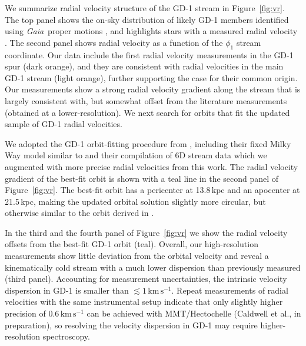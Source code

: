 \documentclass[twocolumn]{aastex63}
\newcommand{\gaia}{\textsl{Gaia}}
\newcommand{\kms}{\ensuremath{\textrm{km}\,\textrm{s}^{-1}}}
\begin{document}
We summarize radial velocity structure of the GD-1 stream in Figure~\ref{fig:vr}.
The top panel shows the on-sky distribution of likely GD-1 members identified using \gaia\ proper motions \citep[small points,][]{pwb}, and highlights stars with a measured radial velocity \citep[orange for this work, gray for literature data from][]{koposov2010}.
The second panel shows radial velocity as a function of the $\phi_1$ stream coordinate.
Our data include the first radial velocity measurements in the GD-1 spur (dark orange), and they are consistent with radial velocities in the main GD-1 stream (light orange), further supporting the case for their common origin.
Our measurements show a strong radial velocity gradient along the stream that is largely consistent with, but somewhat offset from the literature measurements (obtained at a lower-resolution).
We next search for orbits that fit the updated sample of GD-1 radial velocities.

We adopted the GD-1 orbit-fitting procedure from \citet{pwb}, including their fixed Milky Way model similar to \citet{bovy2015} and their compilation of 6D stream data which we augmented with more precise radial velocities from this work.
The radial velocity gradient of the best-fit orbit is shown with a teal line in the second panel of Figure~\ref{fig:vr}.
The best-fit orbit has a pericenter at 13.8\,kpc and an apocenter at 21.5\,kpc, making the updated orbital solution slightly more circular, but otherwise similar to the orbit derived in \citet{pwb}.

In the third and the fourth panel of Figure~\ref{fig:vr} we show the radial velocity offsets from the best-fit GD-1 orbit (teal).
Overall, our high-resolution measurements show little deviation from the orbital velocity and reveal a kinematically cold stream with a much lower dispersion than previously measured (third panel).
Accounting for measurement uncertainties, the intrinsic velocity dispersion in GD-1 is smaller than $\lesssim1\,\kms$.
Repeat measurements of radial velocities with the same instrumental setup indicate that only slightly higher precision of $0.6\,\kms$ can be achieved with MMT/Hectochelle (Caldwell et al., in preparation), so resolving the velocity dispersion in GD-1 may require higher-resolution spectroscopy.

\end{document}
